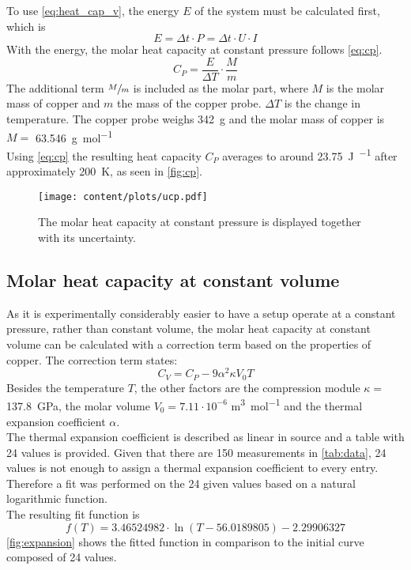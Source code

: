 To use \autoref{eq:heat_cap_v}, the energy $E$ of the system must be calculated first, which is
\begin{equation}
    E = \Delta t \cdot P = \Delta t \cdot U \cdot I
\end{equation}
With the energy, the molar heat capacity at constant pressure follows \autoref{eq:cp}.
\begin{equation}
    C_P = \frac{E}{\Delta T}\cdot\frac{M}{m}
    \label{eq:cp}
\end{equation}
The additional term $\sfrac{M}{m}$ is included as the molar part, where $M$ is the molar mass of copper and $m$ the mass of the copper probe.
$\Delta T$ is the change in temperature.
The copper probe weighs \SI{342}{\gram} and the molar mass of copper is $M=$ \SI{63.546}{\gram\per\mol}\cite{copper}\\
\newline
Using \autoref{eq:cp} the resulting heat capacity $C_P$ averages to around \SI{23.75}{\joule\per{\kelvin\mol}} after approximately \SI{200}{\kelvin}, as seen in \autoref{fig:cp}.

\begin{figure}[H]
    \centering
    \texttt{[image: content/plots/ucp.pdf]}
    \caption{The molar heat capacity at constant pressure is displayed together with its uncertainty.}
    \label{fig:cp}
\end{figure}

\subsection{Molar heat capacity at constant volume}
As it is experimentally considerably easier to have a setup operate at a constant pressure, rather than constant volume, the molar heat capacity at constant volume can be calculated with a correction term based on the properties of copper.
The correction term states:
\begin{equation}
    C_V = C_P - 9\alpha^2\kappa V_0 T
    \label{eq:cv}
\end{equation}
Besides the temperature $T$, the other factors are the compression module $\kappa =$ \SI{137.8}{\giga\pascal}\cite{copper}, the molar volume $V_0 = 7.11\cdot 10^{-6}$ \si{\meter\cubed\per\mol}\cite{copper} and the thermal expansion coefficient $\alpha$.\\
The thermal expansion coefficient is described as linear in source \cite{V47} and a table with 24 values is provided.
Given that there are 150 measurements in \autoref{tab:data}, 24 values is not enough to assign a thermal expansion coefficient to every entry.
Therefore a fit was performed on the 24 given values based on a natural logarithmic function.\\
The resulting fit function is
\begin{equation}
    f(T) = 3.46524982\cdot \ln(T - 56.0189805) - 2.29906327
\end{equation}
\autoref{fig:expansion} shows the fitted function in comparison to the initial curve composed of 24 values.

